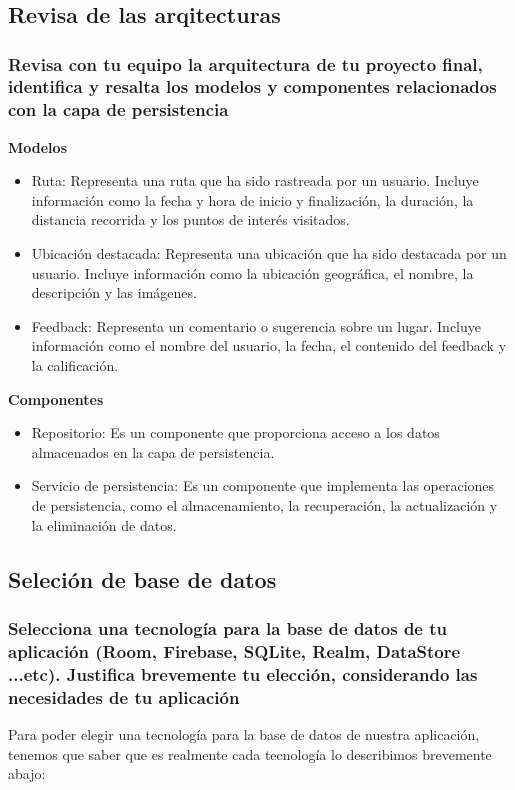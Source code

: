 \chapter{}

\section{Revisa de las arqitecturas}
\subsection*{Revisa con tu equipo la arquitectura de tu proyecto final, identifica y resalta los modelos y componentes relacionados con la capa de persistencia}
\textbf{Modelos}
\begin{itemize}
	\item Ruta: Representa una ruta que ha sido rastreada por un usuario. Incluye información como la fecha y hora de inicio y finalización, la duración, la distancia recorrida y los puntos de interés visitados.
	 \item Ubicación destacada: Representa una ubicación que ha sido destacada por un usuario. Incluye información como la ubicación geográfica, el nombre, la descripción y las imágenes.
	\item Feedback: Representa un comentario o sugerencia sobre un lugar. Incluye información como el nombre del usuario, la fecha, el contenido del feedback y la calificación.
\end{itemize}
\textbf{Componentes}
\begin{itemize}
	\item Repositorio: Es un componente que proporciona acceso a los datos almacenados en la capa de persistencia.
	\item Servicio de persistencia: Es un componente que implementa las operaciones de persistencia, como el almacenamiento, la recuperación, la actualización y la eliminación de datos.
\end{itemize}

\section{Seleción de base de datos}
\subsection*{Selecciona una tecnología para la base de datos de tu aplicación (Room, Firebase, SQLite, Realm, DataStore ...etc). Justifica brevemente tu elección, considerando las necesidades de tu aplicación}
Para poder elegir una tecnología para la base de datos de nuestra aplicación, tenemos que saber que es realmente cada tecnología lo describimos brevemente abajo:

